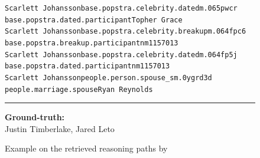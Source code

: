 \begin{figure}[t]
\begin{tcolorbox}[colback=gray!5!white,
                  colframe=gray!75!black,
                  title=CWQ-WebQTest-213\_cbbd86314870b15371b43439eb40587a]
{\texttt{Scarlett Johansson\patharrow base.popstra.celebrity.dated\patharrow m.065pwcr\patharrow \\ base.popstra.dated.participant\patharrow Topher Grace}\\[6pt]

\texttt{Scarlett Johansson\patharrow base.popstra.celebrity.breakup\patharrow m.064fpc6\patharrow \\ base.popstra.breakup.participant\patharrow nm1157013}\\[6pt]

\texttt{Scarlett Johansson\patharrow base.popstra.celebrity.dated\patharrow m.064fp5j\patharrow \\ base.popstra.dated.participant\patharrow nm1157013}\\[6pt]

\texttt{Scarlett Johansson\patharrow people.person.spouse\_s\patharrow m.0ygrd3d\patharrow \\ people.marriage.spouse\patharrow Ryan Reynolds}\\[6pt]

\par}

\rule{\linewidth}{0.4pt}

\textbf{Ground-truth:}\\
Justin Timberlake, Jared Leto

\end{tcolorbox}
\caption{Example on the retrieved reasoning paths by \proj}
\label{fig:example9}
\end{figure}


